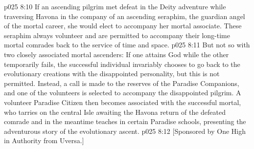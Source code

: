 \vs p025 8:10 If an ascending pilgrim met defeat in the Deity adventure while traversing Havona in the company of an ascending seraphim, the guardian angel of the mortal career, she would elect to accompany her mortal associate. These seraphim always volunteer and are permitted to accompany their long\hyp{}time mortal comrades back to the service of time and space.\plusone
\vs p025 8:11 But not so with two closely associated mortal ascenders: If one attains God while the other temporarily fails, the successful individual invariably chooses to go back to the evolutionary creations with the disappointed personality, but this is not permitted. Instead, a call is made to the reserves of the Paradise Companions, and one of the volunteers is selected to accompany the disappointed pilgrim. A volunteer Paradise Citizen then becomes associated with the successful mortal, who tarries on the central Isle awaiting the Havona return of the defeated comrade and in the meantime teaches in certain Paradise schools, presenting the adventurous story of the evolutionary ascent.
\vsetoff
\vs p025 8:12 [Sponsored by One High in Authority from Uversa.]
